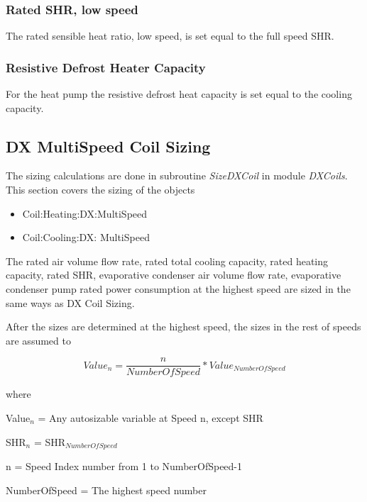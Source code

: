 \subsubsection{Rated SHR, low speed}\label{rated-shr-low-speed}

The rated sensible heat ratio, low speed, is set equal to the full speed SHR.

\subsubsection{Resistive Defrost Heater Capacity}\label{resistive-defrost-heater-capacity}

For the heat pump the resistive defrost heat capacity is set equal to the cooling capacity.

\subsection{DX MultiSpeed Coil Sizing}\label{dx-multispeed-coil-sizing}

The sizing calculations are done in subroutine \emph{SizeDXCoil} in module \emph{DXCoils}. This section covers the sizing of the objects

\begin{itemize}
\item
  Coil:Heating:DX:MultiSpeed
\item
  Coil:Cooling:DX: MultiSpeed
\end{itemize}

The rated air volume flow rate, rated total cooling capacity, rated heating capacity, rated SHR, evaporative condenser air volume flow rate, evaporative condenser pump rated power consumption at the highest speed are sized in the same ways as DX Coil Sizing.

After the sizes are determined at the highest speed, the sizes in the rest of speeds are assumed to

\begin{equation}
Valu{e_n} = \frac{n}{{NumberOfSpeed}}*Valu{e_{NumberOfSpeed}}
\end{equation}

where

Value\(_{n}\) = Any autosizable variable at Speed n, except SHR

SHR\(_{n}\) = SHR\(_{NumberOfSpeed}\)

n = Speed Index number from 1 to NumberOfSpeed-1

NumberOfSpeed = The highest speed number

